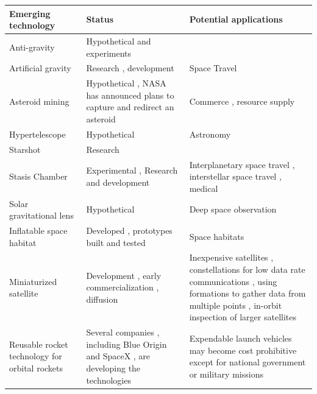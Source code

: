 \documentclass{article}
\begin{document}
\begin{tabular}{lll}
\toprule
Emerging technology & Status & Potential applications \\
\midrule
Anti-gravity & Hypothetical and experiments &  \\
Artificial gravity & Research , development & Space Travel \\
Asteroid mining & Hypothetical , NASA has announced plans to capture and redirect an asteroid & Commerce , resource supply \\
Hypertelescope & Hypothetical & Astronomy \\
Starshot & Research &  \\
Stasis Chamber & Experimental , Research and development & Interplanetary space travel , interstellar space travel , medical \\
Solar gravitational lens & Hypothetical & Deep space observation \\
Inflatable space habitat & Developed , prototypes built and tested & Space habitats \\
Miniaturized satellite & Development , early commercialization , diffusion & Inexpensive satellites , constellations for low data rate communications , using formations to gather data from multiple points , in-orbit inspection of larger satellites \\
Reusable rocket technology for orbital rockets & Several companies , including Blue Origin and SpaceX , are developing the technologies & Expendable launch vehicles may become cost prohibitive except for national government or military missions \\
\bottomrule
\end{tabular}
\end{document}
